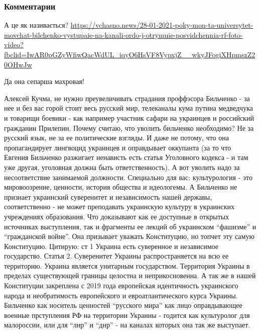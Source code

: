  
 
 
 
 
\subsubsection{Комментарии}
\label{sec:28_01_2021.fb.kuchma_aleksej.1.bilchenko_evgenia_travlja.cmt}

\begin{itemize}


А це як називається? 
\url{https://vchasno.news/28-01-2021-poky-mon-ta-universytet-movchat-bilchenko-vystupaie-na-kanali-ordo-j-otrymuie-posvidchennia-rf-foto-video?fbclid=IwAR0pGZyWfiwQacWdUL_iqyO6HsVF8VypxjZ__wkyJFogiXHpmszZ20OHwJw}


Да она сепарша махровая!


Алексей Кучма, не нужно преувеличивать страдания проффэсора Бильченко - за нее
и без вас горой стоит весь русский мир, телеканалы кума путина медведчука и
товарищи боевики - как например участник сафари на украинцев и российский
гражданин Прилепин. Почему считаю, что уволить бильченко необходимо? Не за
русский язык, не за ее политические взгляды. И даже не потому, что она
пропагандирует лингвоцид украинцев и оправдывает оккупанта (за то что Евгения
Бильченко разжигает ненависть есть статья Уголовного кодекса - и там уже
другая, уголовная должна быть ответственность). А вот уволить надо за
несоответствие занимаемой должности. Специально для вас: культурология - это
мировоозрение, ценности, история общества и идеологемы. А Бильченко не признает
украинский суверенитет и независимость нашей державы, соответственно - не может
преподавать украинскую культуру в украинских учреждениях образования. Что
доказывают как ее доступные в открытых источниках выступления, так и фрагменты
ее лекций об украинском \enquote{фашизме} и \enquote{гражданской войне}. Она призывает уважать
Конституцию, но топчет эту самую Конституцию. Цитирую: ст 1 Украина есть
суверенное и независимое государство. Статья 2. Суверенитет Украины
распространяется на всю ее территорию. Украина является унитарным государством.
Территория Украины в пределах существующей границы целостна и неприкосновенна.
А так же в нашей Конституции закреплена с 2019 года европейская идентичность
украинского народа и необратимость европейского и евроатлантического курса
Украины. Бильченко как носитель ценностей \enquote{русского мира} как лицо
оправдывающее военные прступления РФ на территории Украины - годится как
культуролог для малороссии, или для \enquote{лнр} и \enquote{днр} - на каналах которых она так
же выступает.


\end{itemize}
